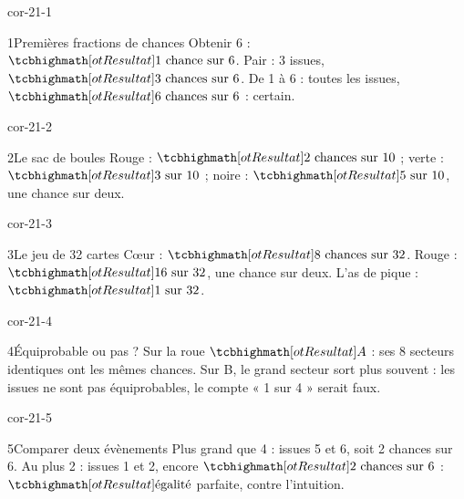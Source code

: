 \clearpage\pagestyle{otMain}\setlength{\otBlocEspacement}{2.5mm}\fontsize{11}{15}\selectfont{}
\begin{blocLivre}{cor-21-1}\begin{corrige}{1}{Premières fractions de chances}
Obtenir 6 : $\res{1\ \text{chance sur }6}$. Pair : 3 issues, $\res{3\ \text{chances sur }6}$. De 1 à 6 : toutes les issues, $\res{6\ \text{chances sur }6}$ : certain.
\end{corrige}\end{blocLivre}
\begin{blocLivre}{cor-21-2}\begin{corrige}{2}{Le sac de boules}
Rouge : $\res{2\ \text{chances sur }10}$ ; verte : $\res{3\ \text{sur }10}$ ; noire : $\res{5\ \text{sur }10}$, une chance sur deux.
\label{fig-cor-21-2}
\end{corrige}\end{blocLivre}
\begin{blocLivre}{cor-21-3}\begin{corrige}{3}{Le jeu de 32 cartes}
Cœur : $\res{8\ \text{chances sur }32}$. Rouge : $\res{16\ \text{sur }32}$, une chance sur deux. L’as de pique : $\res{1\ \text{sur }32}$.
\end{corrige}\end{blocLivre}
\begin{blocLivre}{cor-21-4}\begin{corrige}{4}{Équiprobable ou pas ?}
Sur la roue $\res A$ : ses 8 secteurs identiques ont les mêmes chances. Sur B, le grand secteur sort plus souvent : les issues ne sont pas équiprobables, le compte « 1 sur 4 » serait faux.
\label{fig-cor-21-4}
\end{corrige}\end{blocLivre}
\begin{blocLivre}{cor-21-5}\begin{corrige}{5}{Comparer deux évènements}
Plus grand que 4 : issues 5 et 6, soit 2 chances sur 6. Au plus 2 : issues 1 et 2, encore $\res{2\ \text{chances sur }6}$ : $\res{\text{égalité}}$ parfaite, contre l’intuition.
\end{corrige}\end{blocLivre}
